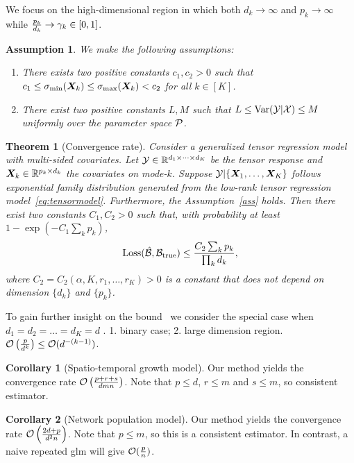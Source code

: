 \documentclass[twoside]{article}
\theoremstyle{plain}
\newtheorem{thm}{Theorem}[section]
\newtheorem{assumption}{Assumption}
\theoremstyle{definition}
\newtheorem{cor}{Corollary}
\begin{document}
We focus on the high-dimensional region in which both $d_k\to \infty$ and $p_k\to\infty$ while ${p_k\over d_k} \to \gamma_k \in[0,1]$. 
\begin{assumption}\label{ass}We make the following assumptions:
\begin{enumerate}
\item There exists two positive constants $c_1,c_2>0$ such that $c_1\leq \sigma_{\min}(\bm X_k)\leq  \sigma_{\max}(\bm X_k)<c_2$ for all $k\in[K]$.
\item There exist two positive constants $L, M$ such that $L\leq \text{Var}(\mathcal{Y}|\mathcal{X})\leq M$ uniformly over the parameter space $\mathcal{P}$. 
\end{enumerate}
\end{assumption}

  
\begin{thm}[Convergence rate]\label{thm:main}
Consider a generalized tensor regression model with multi-sided covariates. Let $\mathcal{Y}\in\mathbb{R}^{d_1\times \cdots\times d_K}$ be the tensor response and $\bm X_k\in\mathbb{R}^{p_k\times d_k}$ the covariates on mode-$k$. Suppose $\mathcal{Y}|\{\bm X_1,\ldots,\bm X_K\}$ follows exponential family distribution generated from the low-rank tensor regression model~\eqref{eq:tensormodel}. Furthermore, the Assumption~\eqref{ass} holds. Then there exist two constants $C_1, C_2>0$ such that, with probability at least $1-\exp(-C_1\sum_k p_k)$, 
\[
\text{Loss}(\hat {\mathcal{B}}, \mathcal{B}_{\text{true}}) \leq  {C_2\sum_k p_k \over \prod_k d_k},
\]
where $C_2=C_2(\alpha, K, r_1,\ldots,r_K)>0$ is a constant that does not depend on dimension $\{d_k\}$ and $\{p_k\}$. 
\end{thm}

To gain further insight on the bound~\label{thm:main} we consider the special case when $d_1=d_2=\ldots=d_K=d$ . 1. binary case; 2. large dimension region. $\mathcal{O}\left({p \over d^k}\right)\leq \mathcal{O}(d^{-(k-1)})$.

\begin{cor}[Spatio-temporal growth model] Our method yields the convergence rate $\mathcal{O}\left({p+r+s\over dmn}\right)$. Note that $p\leq d$, $r\leq m$ and $s\leq m$, so consistent estimator. 
\end{cor}

\begin{cor} [Network population model] Our method yields the convergence rate $\mathcal{O}\left({2d+p\over d^2n}\right)$. Note that $p\leq m$, so this is a consistent estimator. In contrast, a naive repeated glm will give $\mathcal{O}({p\over n})$.
\end{cor}
\end{document}
